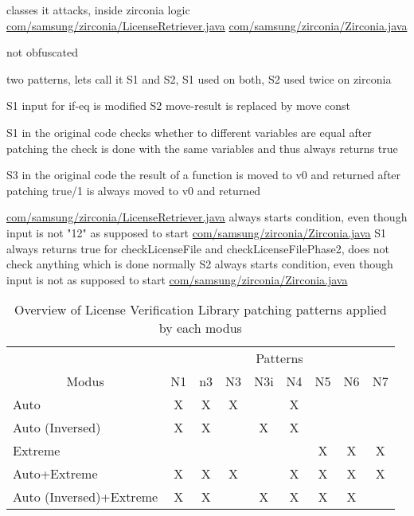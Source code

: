 classes it attacks, inside zirconia logic
\url{com/samsung/zirconia/LicenseRetriever.java}
\url{com/samsung/zirconia/Zirconia.java}

not obfuscated

two patterns, lets call it S1 and S2, S1 used on both, S2 used twice on zirconia



S1
input for if-eq is modified
S2
move-result is replaced by move const


S1
in the original code checks whether to different variables are equal
after patching the check is done with the same variables and thus always returns true

S3
in the original code the result of a function is moved to v0 and returned
after patching true/1 is always moved to v0 and returned



\url{com/samsung/zirconia/LicenseRetriever.java}
always starts condition, even though input is not "12" as supposed to start
\url{com/samsung/zirconia/Zirconia.java}
S1
always returns true for checkLicenseFile and checkLicenseFilePhase2, does not check anything which is done normally
S2
always starts condition, even though input is not as supposed to start
\url{com/samsung/zirconia/Zirconia.java}
\begin{table}[h]
\centering
\begin{tabular}{l|cccccccc}
                           & \multicolumn{8}{c}{Patterns}           \\
\multicolumn{1}{c|}{Modus} & N1 & n3 & N3 & N3i & N4 & N5 & N6 & N7 \\ \hline
Auto                       & X  & X  & X  &     & X  &    &    &    \\
Auto (Inversed)            & X  & X  &    & X   & X  &    &    &    \\
Extreme                    &    &    &    &     &    & X  & X  & X  \\
Auto+Extreme               & X  & X  & X  &     & X  & X  & X  & X  \\
Auto (Inversed)+Extreme    & X  & X  &    & X   & X  & X  & X  &
\end{tabular}
\caption{Overview of License Verification Library patching patterns applied by each modus}
\label{table:patterns}
\end{table}




